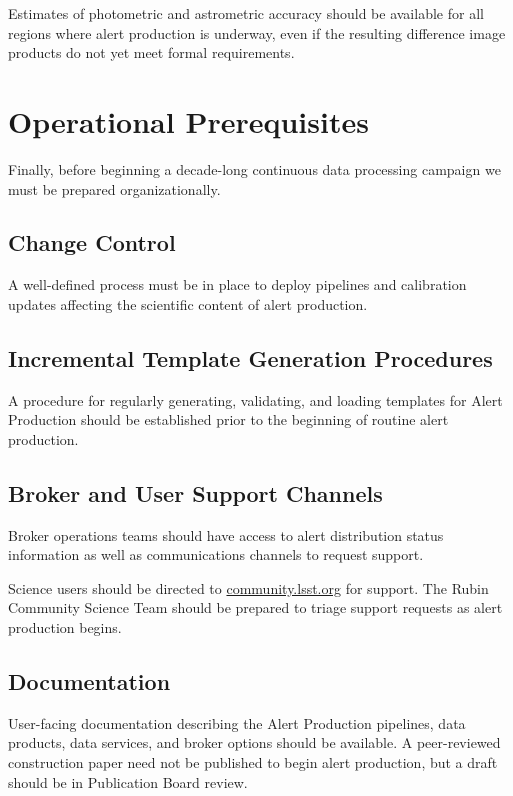 \documentclass[OPS,authoryear,toc]{lsstdoc}
\begin{document}

Estimates of photometric and astrometric accuracy should be available for all regions where alert production is underway, even if the resulting difference image products do not yet meet formal requirements.

\section{Operational Prerequisites}

Finally, before beginning a decade-long continuous data processing campaign we must be prepared organizationally.

\subsection{Change Control}

A well-defined process must be in place to deploy pipelines and calibration updates affecting the scientific content of alert production.

\subsection{Incremental Template Generation Procedures}

A procedure for regularly generating, validating, and loading templates for Alert Production should be established prior to the beginning of routine alert production.

\subsection{Broker and User Support Channels}

Broker operations teams should have access to alert distribution status information as well as communications channels to request support.

Science users should be directed to \url{community.lsst.org} for support.
The Rubin Community Science Team should be prepared to triage support requests as alert production begins.


\subsection{Documentation}

User-facing documentation describing the Alert Production pipelines, data products, data services, and broker options should be available.
A peer-reviewed construction paper need not be published to begin alert production, but a draft should be in Publication Board review.
\end{document}
